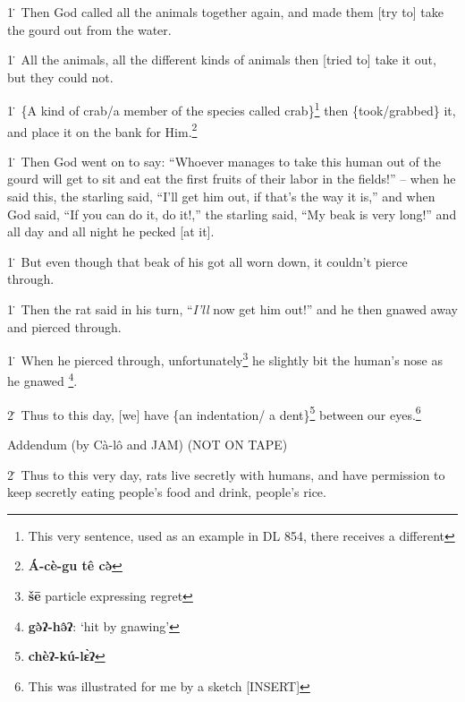 1\. Then God called all the animals together again, and made them [try to] take
the gourd out from the water.

1\. All the animals, all the different kinds of animals then [tried to] take it
out, but they could not.

1\. \{A kind of crab/a member of the species called crab\}\footnote{This very sentence, used as an example in DL 854, there receives a different} then \{took/grabbed\}
it, and place it on the bank for Him.\footnote{\textbf{Á-cè-gu tê cə̀}}

1\. Then God went on to say: ``Whoever manages to take this human out of the gourd
will get to sit and eat the first fruits of their labor in the fields!'' -- when
he said this, the starling said, ``I'll get him out, if that's the way it is,''
and when God said, ``If you can do it, do it!,'' the starling said, ``My beak is
very long!'' and all day and all night he pecked [at it].

1\. But even though that beak of his got all worn down, it couldn't pierce through.

1\. Then the rat said in his turn, ``\textit{I'll} now get him out!'' and he then
gnawed away and pierced through.

1\. When he pierced through, unfortunately\footnote{\textbf{šē} particle expressing regret} he slightly bit the human's nose
as he gnawed \footnote{\textbf{gə̀ʔ-hə̂ʔ}: `hit by gnawing'}.

2\. Thus to this day, [we] have \{an indentation/ a dent\}\footnote{\textbf{chèʔ-kú-lɛ̀ʔ}} between our eyes.\footnote{This was illustrated for me by a sketch [INSERT]}

Addendum (by Cà-lô and JAM) (NOT ON TAPE)

2\. Thus to this very day, rats live secretly with humans, and have permission
to keep secretly eating people's food and drink, people's rice.

